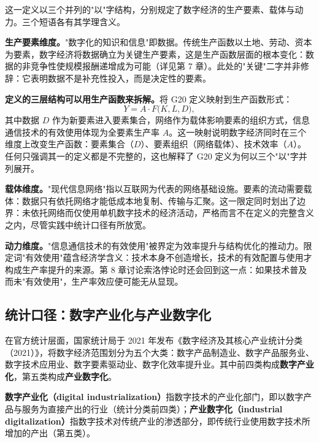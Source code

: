 这一定义以三个并列的"以"字结构，分别规定了数字经济的生产要素、载体与动力。三个短语各有其学理含义。

\textbf{生产要素维度。}"数字化的知识和信息"即数据。传统生产函数以土地、劳动、资本为要素，数字经济将数据确立为关键生产要素，这是生产函数层面的根本变化：数据的非竞争性使规模报酬递增成为可能（详见第 7 章）。此处的"关键"二字并非修辞：它表明数据不是补充性投入，而是决定性的要素。

\textbf{定义的三层结构可以用生产函数来拆解。}将 G20 定义映射到生产函数形式：
\[
Y = A \cdot F\bigl(K, L, D\bigr),
\]
其中数据 $D$ 作为新要素进入要素集合，网络作为载体影响要素的组织方式，信息通信技术的有效使用体现为全要素生产率 $A$。这一映射说明数字经济同时在三个维度上改变生产函数：要素集合（$D$）、要素组织（网络载体）、技术效率（$A$）。任何只强调其一的定义都是不完整的，这也解释了 G20 定义为何以三个"以"字并列展开。

\textbf{载体维度。}"现代信息网络"指以互联网为代表的网络基础设施。要素的流动需要载体：数据只有依托网络才能低成本地复制、传输与汇聚。这一限定同时划出了边界：未依托网络而仅使用单机数字技术的经济活动，严格而言不在定义的完整含义之内，尽管实践中统计口径有所放宽。

\textbf{动力维度。}"信息通信技术的有效使用"被界定为效率提升与结构优化的推动力。限定词"有效使用"蕴含经济学含义：技术本身不创造增长，技术的有效配置与使用才构成生产率提升的来源。第 8 章讨论索洛悖论时还会回到这一点：如果技术普及而未"有效使用"，生产率效应便可能无从显现。

\subsection{统计口径：数字产业化与产业数字化}

在官方统计层面，国家统计局于 2021 年发布《数字经济及其核心产业统计分类（2021）》，将数字经济范围划分为五个大类：数字产品制造业、数字产品服务业、数字技术应用业、数字要素驱动业、数字化效率提升业。其中前四类构成\textbf{数字产业化}，第五类构成\textbf{产业数字化}。

\begin{definition}[数字产业化与产业数字化]
\textbf{数字产业化（digital industrialization）}指数字技术的产业化部门，即以数字产品与服务为直接产出的行业（统计分类前四类）；\textbf{产业数字化（industrial digitalization）}指数字技术对传统产业的渗透部分，即传统行业使用数字技术所增加的产出（第五类）。
\end{definition}

